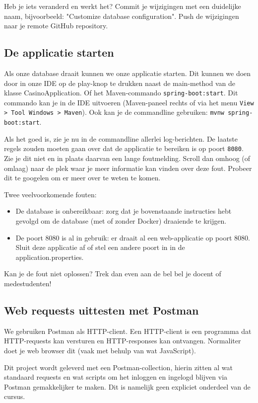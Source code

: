 Heb je iets veranderd en werkt het? 
Commit je wijzigingen met een duidelijke naam, 
bijvoorbeeld: "Customize database configuration". 
Push de wijzigingen naar je remote GitHub repository.

\subsection{De applicatie starten}
Als onze database draait kunnen we onze applicatie starten.
Dit kunnen we doen door in onze IDE op de play-knop te drukken naast de main-method 
van de klasse CasinoApplication. Of het Maven-commando \texttt{spring-boot:start}.
Dit commando kan je in de IDE uitvoeren (Maven-paneel rechts of via het menu \texttt{View > Tool Windows > Maven}). 
Ook kan je de commandline gebruiken: \texttt{mvnw spring-boot:start}.

Als het goed is, zie je nu in de commandline allerlei log-berichten. De laatste regels 
zouden moeten gaan over dat de applicatie te bereiken is op poort \texttt{8080}.
Zie je dit niet en in plaats daarvan een lange foutmelding. Scroll dan omhoog (of omlaag)
naar de plek waar je meer informatie kan vinden over deze fout. Probeer dit te googelen 
om er meer over te weten te komen. 

Twee veelvoorkomende fouten:
\begin{itemize}
    \item De database is onbereikbaar: zorg dat je bovenstaande instructies hebt gevolgd om de database (met of zonder Docker)
    draaiende te krijgen.
    \item De poort 8080 is al in gebruik: er draait al een web-applicatie op poort 8080. 
    Sluit deze applicatie af of stel een andere poort in in de application.properties.
\end{itemize}

Kan je de fout niet oplossen? Trek dan even aan de bel bel je docent of medestudenten!

\subsection{Web requests uittesten met Postman}
We gebruiken Postman als HTTP-client. Een HTTP-client is een programma dat 
HTTP-requests kan versturen en HTTP-responses kan ontvangen.
Normaliter doet je web browser dit (vaak met behulp van wat JavaScript).

Dit project wordt geleverd met een Postman-collection,
hierin zitten al wat standaard requests en wat scripts om het inloggen
en ingelogd blijven via Postman gemakkelijker te maken. Dit is namelijk 
geen expliciet onderdeel van de cursus.

